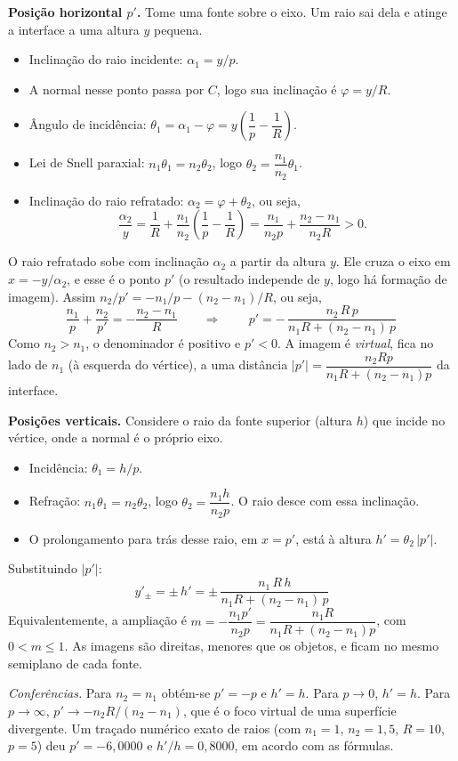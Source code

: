 \documentclass{article}%
\begin{document}
\textbf{Posição horizontal $p'$.} Tome uma fonte sobre o eixo. Um raio sai dela e atinge a interface a uma altura $y$ pequena.
\begin{itemize}
\item Inclinação do raio incidente: $\alpha_1=y/p$.
\item A normal nesse ponto passa por $C$, logo sua inclinação é $\varphi=y/R$.
\item Ângulo de incidência: $\theta_1=\alpha_1-\varphi=y\left(\dfrac1p-\dfrac1R\right)$.
\item Lei de Snell paraxial: $n_1\theta_1=n_2\theta_2$, logo $\theta_2=\dfrac{n_1}{n_2}\theta_1$.
\item Inclinação do raio refratado: $\alpha_2=\varphi+\theta_2$, ou seja,
\[
\frac{\alpha_2}{y}=\frac1R+\frac{n_1}{n_2}\left(\frac1p-\frac1R\right)=\frac{n_1}{n_2p}+\frac{n_2-n_1}{n_2R}>0 .
\]
\end{itemize}
O raio refratado sobe com inclinação $\alpha_2$ a partir da altura $y$. Ele cruza o eixo em $x=-y/\alpha_2$, e esse é o ponto $p'$ (o resultado independe de $y$, logo há formação de imagem). Assim $n_2/p'=-n_1/p-(n_2-n_1)/R$, ou seja,
\[
\frac{n_1}{p}+\frac{n_2}{p'}=-\frac{n_2-n_1}{R}
\qquad\Longrightarrow\qquad
\boxed{\,p'=-\,\frac{n_2\,R\,p}{n_1R+(n_2-n_1)\,p}\,}
\]
Como $n_2>n_1$, o denominador é positivo e $p'<0$. A imagem é \emph{virtual}, fica no lado de $n_1$ (à esquerda do vértice), a uma distância $|p'|=\dfrac{n_2Rp}{n_1R+(n_2-n_1)p}$ da interface.

\textbf{Posições verticais.} Considere o raio da fonte superior (altura $h$) que incide no vértice, onde a normal é o próprio eixo.
\begin{itemize}
\item Incidência: $\theta_1=h/p$.
\item Refração: $n_1\theta_1=n_2\theta_2$, logo $\theta_2=\dfrac{n_1h}{n_2p}$. O raio desce com essa inclinação.
\item O prolongamento para trás desse raio, em $x=p'$, está à altura $h'=\theta_2\,|p'|$.
\end{itemize}
Substituindo $|p'|$:
\[
\boxed{\,y'_{\pm}=\pm\,h'=\pm\,\frac{n_1\,R\,h}{n_1R+(n_2-n_1)\,p}\,}
\]
Equivalentemente, a ampliação é $m=-\dfrac{n_1p'}{n_2p}=\dfrac{n_1R}{n_1R+(n_2-n_1)p}$, com $0<m\le1$. As imagens são direitas, menores que os objetos, e ficam no mesmo semiplano de cada fonte.

\emph{Conferências.} Para $n_2=n_1$ obtém-se $p'=-p$ e $h'=h$. Para $p\to0$, $h'=h$. Para $p\to\infty$, $p'\to-n_2R/(n_2-n_1)$, que é o foco virtual de uma superfície divergente. Um traçado numérico exato de raios (com $n_1=1$, $n_2=1,5$, $R=10$, $p=5$) deu $p'=-6,0000$ e $h'/h=0,8000$, em acordo com as fórmulas.
\end{document}
